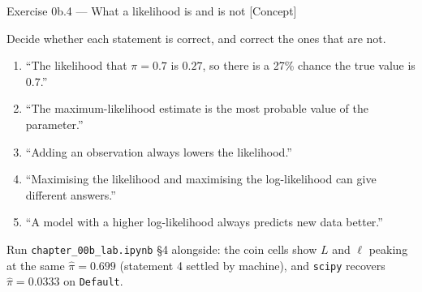 \documentclass[aspectratio=169,11pt]{beamer}
\begin{document}
\begin{frame}{Exercise 0b.4 --- What a likelihood is and is not [Concept]}
  \begin{exercise}
    Decide whether each statement is correct, and correct the ones that are
    not.
    \begin{enumerate}
      \item ``The likelihood that $\pi = 0.7$ is $0.27$, so there is a 27\%
            chance the true value is $0.7$.''
      \item ``The maximum-likelihood estimate is the most probable value of
            the parameter.''
      \item ``Adding an observation always lowers the likelihood.''
      \item ``Maximising the likelihood and maximising the log-likelihood can
            give different answers.''
      \item ``A model with a higher log-likelihood always predicts new data
            better.''
    \end{enumerate}
  \end{exercise}
  \begin{labnote}
    Run \texttt{chapter\_00b\_lab.ipynb} \S4 alongside: the coin cells show $L$
    and $\ell$ peaking at the same $\hat\pi = 0.699$ (statement 4 settled by
    machine), and \texttt{scipy} recovers $\hat\pi = 0.0333$ on \texttt{Default}.
  \end{labnote}
\end{frame}
\end{document}
